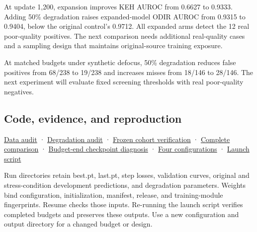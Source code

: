\documentclass[
  10pt,
]{article}
\begin{document}
At update 1,200, expansion improves KEH AUROC from 0.6627 to 0.9333.
Adding 50\% degradation raises expanded-model ODIR AUROC from 0.9315 to
0.9404, below the original control's 0.9712. All expanded arms detect
the 12 real poor-quality positives. The next comparison needs additional
real-quality cases and a sampling design that maintains original-source
training exposure.

At matched budgets under synthetic defocus, 50\% degradation reduces
false positives from 68/238 to 19/238 and increases misses from 18/146
to 28/146. The next experiment will evaluate fixed screening thresholds
with real poor-quality negatives.

\subsection{Code, evidence, and
reproduction}\label{code-evidence-and-reproduction}

\href{data-audit.en.md}{Data audit} ·
\href{degradation-audit.en.md}{Degradation audit} ·
\href{../../../../data/prepared/expanded_20261113/cohort_verification.json}{Frozen
cohort verification} ·
\href{../../../../runs/expanded_20261113/comparison.json}{Complete
comparison} ·
\href{../../../../runs/expanded_20261113/budget_end_comparison.json}{Budget-end
checkpoint diagnosis} ·
\href{../../../../configs/expanded_20261113/}{Four configurations} ·
\href{../../../../tools/start_expansion_experiments_20261113.ps1}{Launch
script}

Run directories retain best.pt, last.pt, step losses, validation curves,
original and stress-condition development predictions, and degradation
parameters. Weights bind configuration, initialization, manifest,
release, and training-module fingerprints. Resume checks those inputs.
Re-running the launch script verifies completed budgets and preserves
these outputs. Use a new configuration and output directory for a
changed budget or design.
\end{document}
